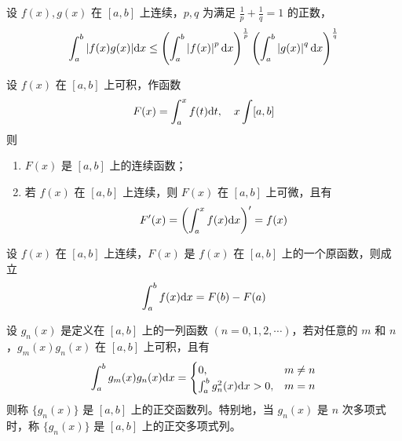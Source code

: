 \documentclass{ctexbook}
\def\diff{\textnormal{d}}
\begin{document}
\begin{proposition}
    设 $f(x), g(x)$ 在 $[a,b]$ 上连续，$p,q$ 为满足 $\frac{1}{p}+\frac{1}{q}=1$ 的正数，
    \begin{equation}
        \int_a^b |f(x)g(x)|\diff x\leq\left(\int_a^b \left|f(x)\right|^p\diff x\right)^{\frac{1}{p}}\left(\int_a^b\left|g(x)\right|^q\diff x\right)^{\frac{1}{q}}
    \end{equation}
\end{proposition}

\begin{theorem}[对积分上限求导]
    设 $f(x)$ 在 $[a,b]$ 上可积，作函数
    \begin{equation}
        F(x)=\int_a^x f(t)\diff t,\quad x\int[a,b]
    \end{equation}
    则
    \begin{enumerate}
        \item $F(x)$ 是 $[a,b]$ 上的连续函数；
        \item 若 $f(x)$ 在 $[a,b]$ 上连续，则 $F(x)$ 在 $[a,b]$ 上可微，且有
        \begin{equation}
            F^\prime (x)=\left(\int_a^x f(x)\diff x\right)^\prime=f(x)
        \end{equation}
    \end{enumerate}
\end{theorem}

\begin{theorem}[微积分基本定理]
    设 $f(x)$ 在 $[a,b]$ 上连续，$F(x)$ 是 $f(x)$ 在 $[a,b]$ 上的一个原函数，则成立
    \begin{equation}
        \int_a^b f(x)\diff x=F(b)-F(a)
    \end{equation}
\end{theorem}

\begin{definition}[正交函数列]
    设 $g_n(x)$ 是定义在 $[a,b]$ 上的一列函数 $(n=0,1,2,\cdots)$，若对任意的 $m$ 和 $n$，$g_m(x)g_n(x)$ 在 $[a,b]$ 上可积，且有
    \begin{equation}
        \int_a^b g_m(x)g_n(x)\diff x=\begin{cases}
            0, & m\neq n\\
            \int_a^b g_n^2(x)\diff x>0, &m=n
        \end{cases}
    \end{equation}
    则称 $\{g_n(x)\}$ 是 $[a,b]$ 上的正交函数列。特别地，当 $g_n(x)$ 是 $n$ 次多项式时，称 $\{g_n(x)\}$ 是 $[a,b]$ 上的正交多项式列。
\end{definition}
\end{document}
